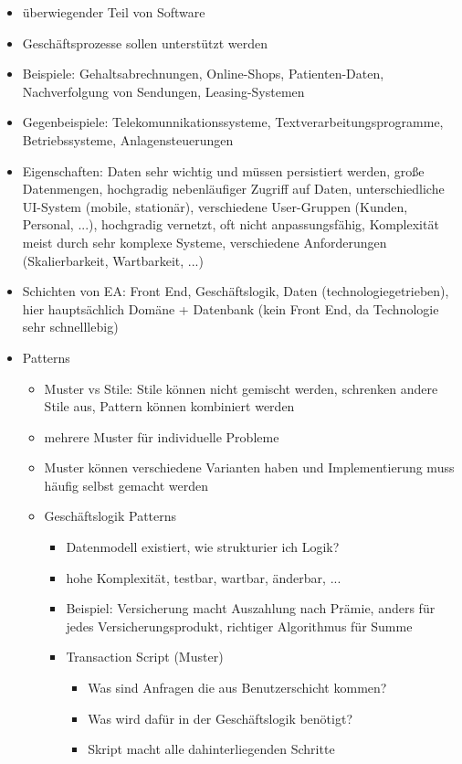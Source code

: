 \documentclass[paper=a4, fontsize=11pt]{scrartcl} %
\numberwithin{equation}{section} %
\numberwithin{figure}{section} %
\numberwithin{table}{section} %
\begin{document}
\begin{itemize}
  \item überwiegender Teil von Software
  \item Geschäftsprozesse sollen unterstützt werden
  \item Beispiele: Gehaltsabrechnungen, Online-Shops, Patienten-Daten, Nachverfolgung von Sendungen, Leasing-Systemen
  \item Gegenbeispiele: Telekomunnikationssysteme, Textverarbeitungsprogramme, Betriebssysteme, Anlagensteuerungen
  \item Eigenschaften: Daten sehr wichtig und müssen persistiert werden, große Datenmengen, hochgradig nebenläufiger Zugriff auf Daten, unterschiedliche UI-System (mobile, stationär), verschiedene User-Gruppen (Kunden, Personal, ...), hochgradig vernetzt, oft nicht anpassungsfähig, Komplexität meist durch sehr komplexe Systeme, verschiedene Anforderungen (Skalierbarkeit, Wartbarkeit, ...)
  \item Schichten von EA: Front End, Geschäftslogik, Daten (technologiegetrieben), hier hauptsächlich Domäne + Datenbank (kein Front End, da Technologie sehr schnelllebig)
  \item Patterns
  \begin{itemize}
    \item Muster vs Stile: Stile können nicht gemischt werden, schrenken andere Stile aus, Pattern können kombiniert werden
    \item mehrere Muster für individuelle Probleme
    \item Muster können verschiedene Varianten haben und Implementierung muss häufig selbst gemacht werden
    \item Geschäftslogik Patterns
    \begin{itemize}
      \item Datenmodell existiert, wie strukturier ich Logik?
      \item hohe Komplexität, testbar, wartbar, änderbar, ...
      \item Beispiel: Versicherung macht Auszahlung nach Prämie, anders für jedes Versicherungsprodukt, richtiger Algorithmus für Summe
      \item Transaction Script (Muster)
      \begin{itemize}
        \item Was sind Anfragen die aus Benutzerschicht kommen?
        \item Was wird dafür in der Geschäftslogik benötigt?
        \item Skript macht alle dahinterliegenden Schritte

\end{itemize}
\end{itemize}
\end{itemize}
\end{itemize}
\end{document}
